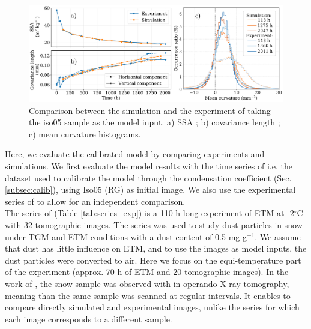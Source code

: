 \documentclass[draft,ms]{agujournal2019}
\begin{document}
\begin{figure}
    \centering
    \includegraphics[width=\linewidth]{Figures/microstruct_isoFlin_exp_simu.pdf}
    \caption{Comparison between the simulation and the experiment of \protect{} taking the iso05 sample as the model input. a) SSA ; b) covariance length ; c) mean curvature histograms.}
    \label{fig:flin_evaluation}
\end{figure}

Here, we evaluate the calibrated model by comparing experiments and simulations. We first evaluate the model results with the time series of  i.e. the dataset used to calibrate the model through the condensation coefficient (Sec. \ref{subsec:calib}), using  Iso05 (RG) as initial image. We also use the experimental series of  to allow for an independent comparison.\\

The series of  (Table \ref{tab:series_exp}) is a 110 h long experiment of ETM at -2$^\circ$C with 32 tomographic images. The series was used to study dust particles in snow under TGM and ETM conditions with a dust content of 0.5 mg g$^{-1}$. We assume that dust has little influence on ETM, and to use the images as model inputs, the dust particles were converted to air. Here we focus on the equi-temperature part of the experiment (approx. 70 h of ETM and 20 tomographic images). In the work of , the snow sample was observed with in operando X-ray tomography, meaning than the same sample was scanned at regular intervals. It enables to compare directly simulated and experimental images, unlike the  series for which each image corresponds to a different sample.\\
\end{document}

